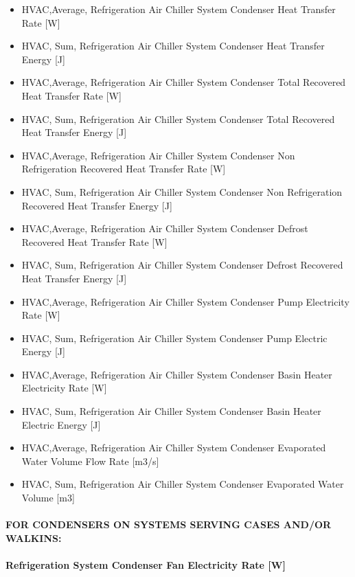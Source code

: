 \begin{itemize}
\item
  HVAC,Average, Refrigeration Air Chiller System Condenser Heat Transfer Rate {[}W{]}
\item
  HVAC, Sum, Refrigeration Air Chiller System Condenser Heat Transfer Energy {[}J{]}
\item
  HVAC,Average, Refrigeration Air Chiller System Condenser Total Recovered Heat Transfer Rate {[}W{]}
\item
  HVAC, Sum, Refrigeration Air Chiller System Condenser Total Recovered Heat Transfer Energy {[}J{]}
\item
  HVAC,Average, Refrigeration Air Chiller System Condenser Non Refrigeration Recovered Heat Transfer Rate {[}W{]}
\item
  HVAC, Sum, Refrigeration Air Chiller System Condenser Non Refrigeration Recovered Heat Transfer Energy {[}J{]}
\item
  HVAC,Average, Refrigeration Air Chiller System Condenser Defrost Recovered Heat Transfer Rate {[}W{]}
\item
  HVAC, Sum, Refrigeration Air Chiller System Condenser Defrost Recovered Heat Transfer Energy {[}J{]}
\item
  HVAC,Average, Refrigeration Air Chiller System Condenser Pump Electricity Rate {[}W{]}
\item
  HVAC, Sum, Refrigeration Air Chiller System Condenser Pump Electric Energy {[}J{]}
\item
  HVAC,Average, Refrigeration Air Chiller System Condenser Basin Heater Electricity Rate {[}W{]}
\item
  HVAC, Sum, Refrigeration Air Chiller System Condenser Basin Heater Electric Energy {[}J{]}
\item
  HVAC,Average, Refrigeration Air Chiller System Condenser Evaporated Water Volume Flow Rate {[}m3/s{]}
\item
  HVAC, Sum, Refrigeration Air Chiller System Condenser Evaporated Water Volume {[}m3{]}
\end{itemize}

\paragraph{FOR CONDENSERS ON SYSTEMS SERVING CASES AND/OR WALKINS:}\label{for-condensers-on-systems-serving-cases-andor-walkins-1}

\paragraph{Refrigeration System Condenser Fan Electricity Rate {[}W{]}}\label{refrigeration-system-condenser-fan-electric-power-w-1}

